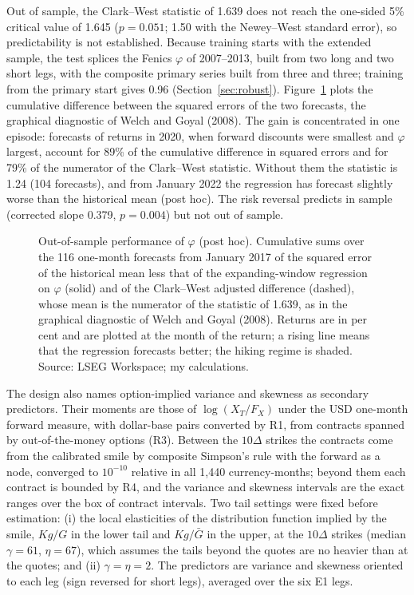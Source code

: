 \documentclass[11pt]{article}
\theoremstyle{result}
\newcommand{\D}{\Delta}
\begin{document}
Out of sample, the Clark--West statistic of 1.639 does not reach the one-sided 5\% critical value of 1.645 ($p=0.051$; 1.50 with the Newey--West standard error), so predictability is not established. Because training starts with the extended sample, the test splices the Fenics $\varphi$ of 2007--2013, built from two long and two short legs, with the composite primary series built from three and three; training from the primary start gives 0.96 (Section~\ref{sec:robust}). Figure~\ref{fig:oos} plots the cumulative difference between the squared errors of the two forecasts, the graphical diagnostic of Welch and Goyal (2008). The gain is concentrated in one episode: forecasts of returns in 2020, when forward discounts were smallest and $\varphi$ largest, account for 89\% of the cumulative difference in squared errors and for 79\% of the numerator of the Clark--West statistic. Without them the statistic is 1.24 (104 forecasts), and from January 2022 the regression has forecast slightly worse than the historical mean (post hoc). The risk reversal predicts in sample (corrected slope 0.379, $p=0.004$) but not out of sample.

\begin{figure}[t]
\centering

\caption{Out-of-sample performance of $\varphi$ (post hoc). Cumulative sums over the 116 one-month forecasts from January 2017 of the squared error of the historical mean less that of the expanding-window regression on $\varphi$ (solid) and of the Clark--West adjusted difference (dashed), whose mean is the numerator of the statistic of 1.639, as in the graphical diagnostic of Welch and Goyal (2008). Returns are in per cent and are plotted at the month of the return; a rising line means that the regression forecasts better; the hiking regime is shaded. Source: LSEG Workspace; my calculations.}\label{fig:oos}
\end{figure}

The design also names option-implied variance and skewness as secondary predictors. Their moments are those of $\log(X_T/F_X)$ under the USD one-month forward measure, with dollar-base pairs converted by R1, from contracts spanned by out-of-the-money options (R3). Between the $10\D$ strikes the contracts come from the calibrated smile by composite Simpson's rule with the forward as a node, converged to $10^{-10}$ relative in all 1,440 currency-months; beyond them each contract is bounded by R4, and the variance and skewness intervals are the exact ranges over the box of contract intervals. Two tail settings were fixed before estimation: (i) the local elasticities of the distribution function implied by the smile, $Kg/G$ in the lower tail and $Kg/\bar G$ in the upper, at the $10\D$ strikes (median $\gamma=61$, $\eta=67$), which assumes the tails beyond the quotes are no heavier than at the quotes; and (ii) $\gamma=\eta=2$. The predictors are variance and skewness oriented to each leg (sign reversed for short legs), averaged over the six E1 legs.
\end{document}
